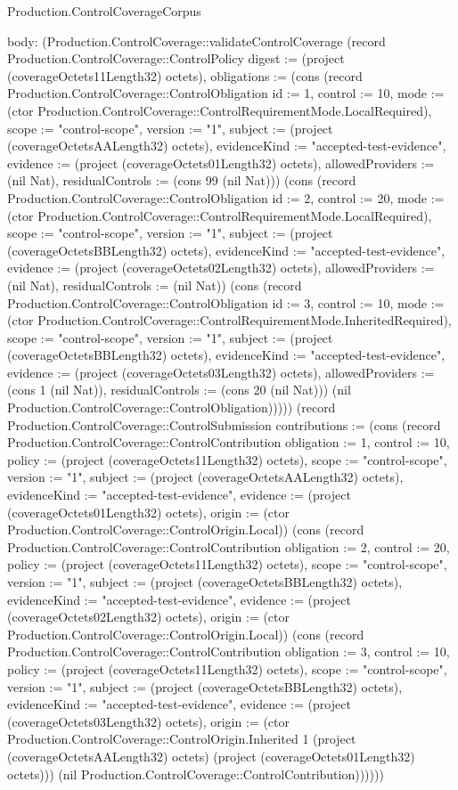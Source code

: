 \begin{lexlean}{Production.ControlCoverageCorpus}
\begin{semanticmodule}
{  body: (Production.ControlCoverage::validateControlCoverage (record Production.ControlCoverage::ControlPolicy {digest := (project (coverageOctets11Length32) octets), obligations := (cons (record Production.ControlCoverage::ControlObligation {id := 1, control := 10, mode := (ctor Production.ControlCoverage::ControlRequirementMode.LocalRequired), scope := "control-scope", version := "1", subject := (project (coverageOctetsAALength32) octets), evidenceKind := "accepted-test-evidence", evidence := (project (coverageOctets01Length32) octets), allowedProviders := (nil Nat), residualControls := (cons 99 (nil Nat))}) (cons (record Production.ControlCoverage::ControlObligation {id := 2, control := 20, mode := (ctor Production.ControlCoverage::ControlRequirementMode.LocalRequired), scope := "control-scope", version := "1", subject := (project (coverageOctetsBBLength32) octets), evidenceKind := "accepted-test-evidence", evidence := (project (coverageOctets02Length32) octets), allowedProviders := (nil Nat), residualControls := (nil Nat)}) (cons (record Production.ControlCoverage::ControlObligation {id := 3, control := 10, mode := (ctor Production.ControlCoverage::ControlRequirementMode.InheritedRequired), scope := "control-scope", version := "1", subject := (project (coverageOctetsBBLength32) octets), evidenceKind := "accepted-test-evidence", evidence := (project (coverageOctets03Length32) octets), allowedProviders := (cons 1 (nil Nat)), residualControls := (cons 20 (nil Nat))}) (nil Production.ControlCoverage::ControlObligation))))}) (record Production.ControlCoverage::ControlSubmission {contributions := (cons (record Production.ControlCoverage::ControlContribution {obligation := 1, control := 10, policy := (project (coverageOctets11Length32) octets), scope := "control-scope", version := "1", subject := (project (coverageOctetsAALength32) octets), evidenceKind := "accepted-test-evidence", evidence := (project (coverageOctets01Length32) octets), origin := (ctor Production.ControlCoverage::ControlOrigin.Local)}) (cons (record Production.ControlCoverage::ControlContribution {obligation := 2, control := 20, policy := (project (coverageOctets11Length32) octets), scope := "control-scope", version := "1", subject := (project (coverageOctetsBBLength32) octets), evidenceKind := "accepted-test-evidence", evidence := (project (coverageOctets02Length32) octets), origin := (ctor Production.ControlCoverage::ControlOrigin.Local)}) (cons (record Production.ControlCoverage::ControlContribution {obligation := 3, control := 10, policy := (project (coverageOctets11Length32) octets), scope := "control-scope", version := "1", subject := (project (coverageOctetsBBLength32) octets), evidenceKind := "accepted-test-evidence", evidence := (project (coverageOctets03Length32) octets), origin := (ctor Production.ControlCoverage::ControlOrigin.Inherited 1 (project (coverageOctetsAALength32) octets) (project (coverageOctets01Length32) octets))}) (nil Production.ControlCoverage::ControlContribution))))}))
}


\end{semanticmodule}
\end{lexlean}

